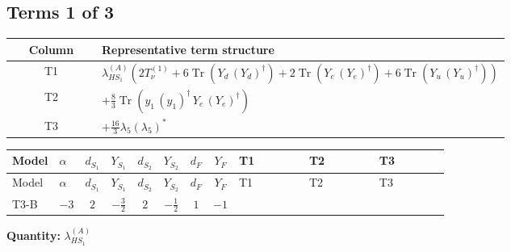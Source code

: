 \documentclass[8pt]{article}
\begin{document}
\begin{landscape}
\subsection*{Terms 1 of 3}
\begin{center}
\begin{tabular}{@{}c >{\raggedright\arraybackslash}p{0.82\linewidth}@{}}
\toprule
Column & Representative term structure \\
\midrule
T1 & \(\displaystyle {\lambda_{HS_1}^{(A)}} (2 T_{\nu}^{(1)}+6 \operatorname{Tr}\!\left({Y_d}\,\left({Y_d}\right)^{\dagger}\right)+2 \operatorname{Tr}\!\left({Y_e}\,\left({Y_e}\right)^{\dagger}\right)+6 \operatorname{Tr}\!\left({Y_u}\,\left({Y_u}\right)^{\dagger}\right))\) \\
\midrule
T2 & \(\displaystyle +\frac{8}{3} \operatorname{Tr}\!\left({y_1}\,\left({y_1}\right)^{\dagger}\,{Y_e}\,\left({Y_e}\right)^{\dagger}\right)\) \\
\midrule
T3 & \(\displaystyle +\frac{16}{3} {\lambda_5} \left({\lambda_5}\right)^{*}\) \\
\midrule
\bottomrule
\end{tabular}
\end{center}
\smallskip
\tiny
\begin{longtable}{@{}llcccccc >{\raggedright\arraybackslash}p{0.21\linewidth} >{\raggedright\arraybackslash}p{0.21\linewidth} >{\raggedright\arraybackslash}p{0.21\linewidth}@{}}
\toprule
Model & $\alpha$ & $d_{S_1}$ & $Y_{S_1}$ & $d_{S_2}$ & $Y_{S_2}$ & $d_F$ & $Y_F$ & T1 & T2 & T3 \\
\midrule
\endfirsthead
\toprule
Model & $\alpha$ & $d_{S_1}$ & $Y_{S_1}$ & $d_{S_2}$ & $Y_{S_2}$ & $d_F$ & $Y_F$ & T1 & T2 & T3 \\
\midrule
\endhead
T3-B & $-3$ & $2$ & $-\frac{3}{2}$ & $2$ & $-\frac{1}{2}$ & $1$ & $-1$ & \scriptsize\adjustbox{max width=\linewidth}{$\begin{gathered} {\lambda_{HS_1}^{(A)}} (2 T_{\nu}^{(1)}+6 \operatorname{Tr}\!\left({Y_d}\,\left({Y_d}\right)^{\dagger}\right)+2 \operatorname{Tr}\!\left({Y_e}\,\left({Y_e}\right)^{\dagger}\right)+6 \operatorname{Tr}\!\left({Y_u}\,\left({Y_u}\right)^{\dagger}\right))\end{gathered}$} & \scriptsize\adjustbox{max width=\linewidth}{$\begin{gathered} +\frac{8}{3} \operatorname{Tr}\!\left({y_1}\,\left({y_1}\right)^{\dagger}\,{Y_e}\,\left({Y_e}\right)^{\dagger}\right)\end{gathered}$} & \scriptsize\adjustbox{max width=\linewidth}{$\begin{gathered} +\frac{16}{3} {\lambda_5} \left({\lambda_5}\right)^{*}\end{gathered}$} \\
\midrule
\bottomrule
\end{longtable}
\clearpage
\noindent\textbf{Quantity: }$\lambda_{HS_1}^{(A)}$\par\smallskip

\end{landscape}
\end{document}
